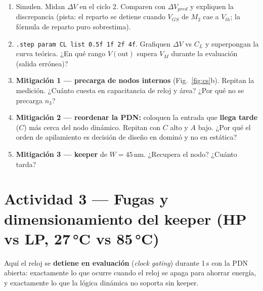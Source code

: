 \documentclass[11pt,a4paper]{article}
\begin{document}
\begin{tarea}
\begin{enumerate}[nosep,leftmargin=*]
\item Simulen. Midan $\Delta V$ en el ciclo 2. Comparen con $\Delta V_{pred}$ y expliquen la discrepancia (pista: el reparto se detiene cuando $V_{GS}$ de $M_2$ cae a $V_{th}$; la fórmula de reparto puro sobrestima).
\item \texttt{.step param CL list 0.5f 1f 2f 4f}. Grafiquen $\Delta V$ vs $C_L$ y superpongan la curva teórica. ¿En qué rango $V(\mathrm{out})$ supera $V_M$ durante la evaluación (salida errónea)?
\item \textbf{Mitigación 1 — precarga de nodos internos} (Fig.~\ref{fig:cs}b). Repitan la medición. ¿Cuánto cuesta en capacitancia de reloj y área? ¿Por qué no se precarga $n_3$?
\item \textbf{Mitigación 2 — reordenar la PDN:} coloquen la entrada que \textbf{llega tarde} ($C$) más cerca del nodo dinámico. Repitan con $C$ alto y $A$ bajo. ¿Por qué el orden de apilamiento es decisión de diseño en dominó y no en estática?
\item \textbf{Mitigación 3 — keeper} de $W=45$\,nm. ¿Recupera el nodo? ¿Cuánto tarda?
\end{enumerate}
\end{tarea}

\section{Actividad 3 — Fugas y dimensionamiento del keeper (HP vs LP, 27\,°C vs 85\,°C)}

Aquí el reloj se \textbf{detiene en evaluación} (\emph{clock gating}) durante 1\,\textmu s con la PDN abierta: exactamente lo que ocurre cuando el reloj se apaga para ahorrar energía, y exactamente lo que la lógica dinámica no soporta sin keeper.
\end{document}

